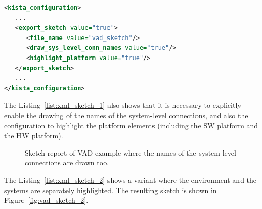 \begin{lstlisting}[language=XML, caption={Configuring sketch report from the XML interface.}, label=list:xml_sketch_1]
<kista_configuration>
   ...
   <export_sketch value="true">
      <file_name value="vad_sketch"/>
      <draw_sys_level_conn_names value="true"/>
      <highlight_platform value="true"/>
   </export_sketch>	
   ...
</kista_configuration>
\end{lstlisting}

The Listing~\ref{list:xml_sketch_1} also shows 
that it is necessary to explicitly enable the drawing of the names 
of the system-level connections, and also the configuration to highlight 
the platform elements (including the SW platform and the HW platform).

\begin{figure}[h]
\centering
\caption{Sketch report of VAD example where the names of the system-level connections are drawn too.} 
\label{fig:vad_sketch_1}
\end{figure}

The Listing~\ref{list:xml_sketch_2} shows a variant where the environment and the systems 
are separately highlighted.
The resulting sketch is shown in Figure~\ref{fig:vad_sketch_2}.

